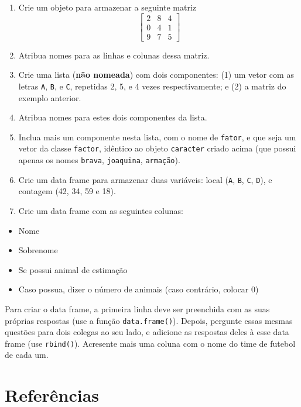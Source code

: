 \documentclass[
  10pt,
  a4paper]{book}
\providecommand{\tightlist}{%
  \setlength{\itemsep}{0pt}\setlength{\parskip}{0pt}}
\begin{document}
\begin{enumerate}
\def\labelenumi{\arabic{enumi}.}
\tightlist
\item
  Crie um objeto para armazenar a seguinte matriz
  \[\left[ \begin{array}{ccc}
          2 & 8 & 4 \\
          0 & 4 & 1 \\
          9 & 7 & 5
          \end{array} \right]\]
\item
  Atribua nomes para as linhas e colunas dessa matriz.
\item
  Crie uma lista (\textbf{não nomeada}) com dois componentes: (1) um vetor
  com as letras \texttt{A}, \texttt{B}, e \texttt{C}, repetidas 2, 5, e 4 vezes
  respectivamente; e (2) a matriz do exemplo anterior.
\item
  Atribua nomes para estes dois componentes da lista.
\item
  Inclua mais um componente nesta lista, com o nome de \texttt{fator}, e que
  seja um vetor da classe \texttt{factor}, idêntico ao objeto \texttt{caracter} criado
  acima (que possui apenas os nomes \texttt{brava}, \texttt{joaquina}, \texttt{armação}).
\item
  Crie um data frame para armazenar duas variáveis: local (\texttt{A}, \texttt{B},
  \texttt{C}, \texttt{D}), e contagem (42, 34, 59 e 18).
\item
  Crie um data frame com as seguintes colunas:
\end{enumerate}

\begin{itemize}
\tightlist
\item
  Nome
\item
  Sobrenome
\item
  Se possui animal de estimação
\item
  Caso possua, dizer o número de animais (caso contrário, colocar 0)
\end{itemize}

Para criar o data frame, a primeira linha deve ser preenchida com as
suas próprias respostas (use a função \texttt{data.frame()}). Depois, pergunte
essas mesmas questões para dois colegas ao seu lado, e adicione as
respostas deles à esse data frame (use \texttt{rbind()}). Acresente mais uma
coluna com o nome do time de futebol de cada um.

\hypertarget{referuxeancias-1}{%
\section*{Referências}\label{referuxeancias-1}}
\end{document}
